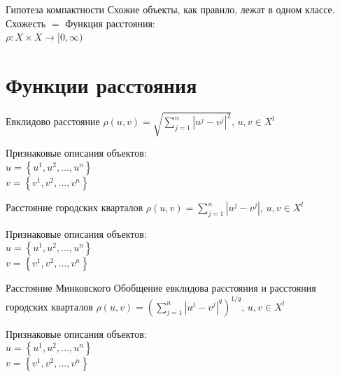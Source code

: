 \documentclass[10pt]{beamer}
\begin{document}
\begin{frame}{Гипотеза компактности}
	Схожие объекты, как правило, лежат в одном классе.\\
	\bigbreak
	\alert{Схожесть} $=$ Функция расстояния:\\
	${\rho: X \times X \rightarrow [0, \infty) }$
\end{frame}

\section{Функции расстояния}

{
\begin{frame}{Евклидово расстояние}
	${\rho (u, v) = \sqrt{\sum\limits_{j=1}^n |u^j - v^j|^2}}$, \hspace{5mm} ${u, v \in X^{l}}$\\
	\bigbreak
	
	Признаковые описания объектов:\\
	${u = \left\{ u^1, u^2, ..., u^n \right\}}$ \\
	${v = \left\{v^1, v^2, ..., v^n \right\} }$ 
\end{frame}
}

{
\begin{frame}{Расстояние городских кварталов}
	${\rho (u, v) = \sum\limits_{j=1}^n |u^j - v^j|}$, \hspace{5mm} ${u, v \in X^{l}}$\\
	\bigbreak
	
	Признаковые описания объектов:\\
	${u = \left\{ u^1, u^2, ..., u^n \right\}}$ \\
	${v = \left\{v^1, v^2, ..., v^n \right\} }$ 
\end{frame}
}

{
\begin{frame}{Расстояние Минковского}
	Обобщение евклидова расстояния и расстояния городских кварталов
	\bigbreak
	${\rho (u, v) = (\sum\limits_{j=1}^n |u^j - v^j|^q)^{1/q}}$, \hspace{5mm} ${u, v \in X^{l}}$\\
	\bigbreak
	
	Признаковые описания объектов:\\
	${u = \left\{ u^1, u^2, ..., u^n \right\}}$ \\
	${v = \left\{v^1, v^2, ..., v^n \right\} }$ 
\end{frame}
}
\end{document}
